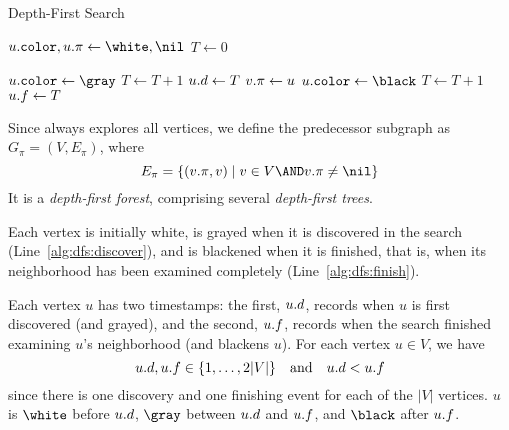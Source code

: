 \begin{algorithm}
\caption{Depth-First Search}\label{alg:dfs}
\begin{algorithmic}[1]
    \State $\attrib{u}{color},\attrib{u}{\pi}\gets \white,\nil$
  \EndFor
  \State $T\gets 0$ 
   \label{alg:dfs:for_all_vertices}
      \State {}  \label{alg:dfs:new_tree}
    \EndIf
  \EndFor
\EndFunction

  \State $\attrib{u}{color}\gets\gray$  \label{alg:dfs:discover}
  \State $T\gets T+1$
  \State $u\mathtt{.}d\gets T$ \label{alg:dfs:discover_time}
    \label{alg:dfs:explore_edges}
      \State $v\mathtt{.}\mathtt{\pi}\gets u$
      \State {}  \label{alg:dfs:recursive_call}
    \EndIf
  \EndFor
  \State $\attrib{u}{color}\gets\black$  \label{alg:dfs:finish}
  \State $T\gets T+1$
  \State $u\mathtt{.}f\gets T$ \label{alg:dfs:finish_time}
\EndFunction
\end{algorithmic}
\end{algorithm}

Since  always explores all vertices, we define the predecessor subgraph as \(G_\pi=(V,E_\pi)\), where
\[
E_\pi = \{(v.\pi,v)\mid v\in V \AND v.\pi \neq \nil\}
\]
It is a \emph{depth-first forest}, comprising several \emph{depth-first trees}.

Each vertex is initially white, is grayed when it is discovered in the search (Line~\ref{alg:dfs:discover}), and is blackened when it is finished, that is, when its neighborhood has been examined completely (Line~\ref{alg:dfs:finish}).

Each vertex \(u\) has two timestamps: the first, \(u\mathtt{.}d\), records when \(u\) is first discovered (and grayed), and the second, \(u\mathtt{.}f\), records when the search finished examining \(u\)'s neighborhood (and blackens \(u\)).
For each vertex \(u \in V\), we have
\[
u\mathtt{.}d, u\mathtt{.}f \in \{1, \ldots, 2|V|\} \quad \text{and} \quad u\mathtt{.}d < u\mathtt{.}f 
\]
since there is one discovery and one finishing event for each of the \(|V|\) vertices.
\(u\) is \(\white\) before \(u\mathtt{.}d\), \(\gray\) between \(u\mathtt{.}d\) and \(u\mathtt{.}f\), and \(\black\) after \(u\mathtt{.}f\).

